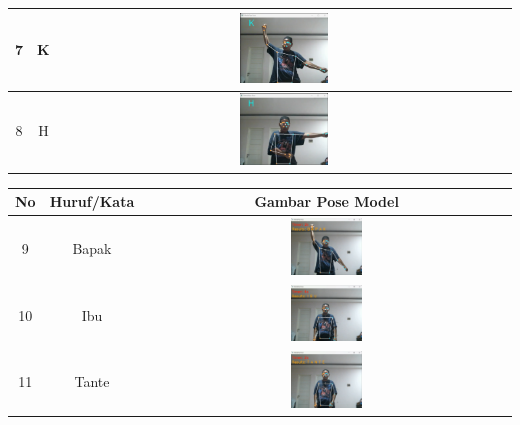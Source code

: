 \begin{table}[!hbt]
\begin{tabular}{|c|c|c|}
	\hline
	7 & K & \includegraphics[width=0.2\textwidth]{gambar/bener/HurufK_ModelCNN_Fachry.png} \\
	\hline
	8 & H & \includegraphics[width=0.2\textwidth]{gambar/bener/HurufH_ModelCNN_Fachry.png} \\
	\hline
	\end{tabular}
	\end{table}

\begin{table}[!hbt]
	\centering
	\begin{tabular}{|c|c|c|}
		\hline
		No & Huruf/Kata & Gambar Pose Model  \\
		\hline
		9 & Bapak & \includegraphics[width=0.2\textwidth]{gambar/bener/HurufBapak_ModelCNN_Fachry.png} \\
		\hline
		10 & Ibu & \includegraphics[width=0.2\textwidth]{gambar/bener/HurufIbu_ModelCNN_Fachry.png} \\
		\hline
		11 & Tante & \includegraphics[width=0.2\textwidth]{gambar/bener/HurufTante_ModelCNN_Fachry.png} \\
		\hline
	\end{tabular}
\end{table}

